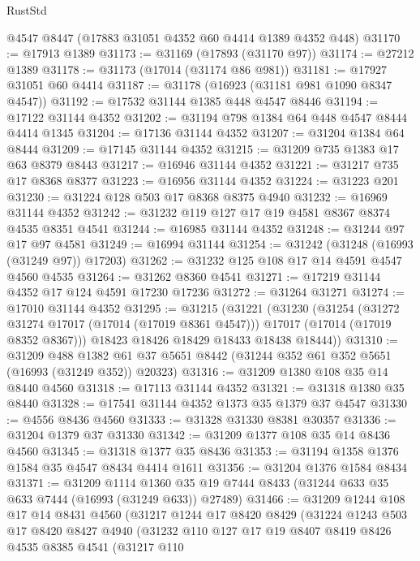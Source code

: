 \begin{lexlean}{RustStd}
\begin{coremodule}
{\begin{coremodule}
{{{{{{{{{{{{{{{{{{{{{{{{{{{{{{{{{{{{{{{{{{{{{{{{{{{{{{{    @4547
    @8447
    (@17883 @31051 @4352 @60 @4414 @1389 @4352 @448)
@31170 := @17913 @1389
@31173 := @31169 (@17893 (@31170 @97))
@31174 := @27212 @1389
@31178 := @31173 (@17014 (@31174 @86 @981))
@31181 := @17927 @31051 @60 @4414
@31187 := @31178 (@16923 (@31181 @981 @1090 @8347 @4547))
@31192 := @17532 @31144 @1385 @448 @4547 @8446
@31194 := @17122 @31144 @4352
@31202 := @31194 @798 @1384 @64 @448 @4547 @8444 @4414 @1345
@31204 := @17136 @31144 @4352
@31207 := @31204 @1384 @64 @8444
@31209 := @17145 @31144 @4352
@31215 := @31209 @735 @1383 @17 @63 @8379 @8443
@31217 := @16946 @31144 @4352
@31221 := @31217 @735 @17 @8368 @8377
@31223 := @16956 @31144 @4352
@31224 := @31223 @201
@31230 := @31224 @128 @503 @17 @8368 @8375 @4940
@31232 := @16969 @31144 @4352
@31242 := @31232 @119 @127 @17 @19 @4581 @8367 @8374 @4535 @8351 @4541
@31244 := @16985 @31144 @4352
@31248 := @31244 @97 @17 @97 @4581
@31249 := @16994 @31144
@31254 := @31242 (@31248 (@16993 (@31249 @97)) @17203)
@31262 := @31232 @125 @108 @17 @14 @4591 @4547 @4560 @4535
@31264 := @31262 @8360 @4541
@31271 := @17219 @31144 @4352 @17 @124 @4591 @17230 @17236
@31272 := @31264 @31271
@31274 := @17010 @31144 @4352
@31295 := @31215
    (@31221
      (@31230
        (@31254
          (@31272 @31274 @17017 (@17014 (@17019 @8361 @4547)))
          @17017
          (@17014 (@17019 @8352 @8367)))
        @18423
        @18426
        @18429
        @18433
        @18438
        @18444))
@31310 := @31209
    @488
    @1382
    @61
    @37
    @5651
    @8442
    (@31244 @352 @61 @352 @5651 (@16993 (@31249 @352)) @20323)
@31316 := @31209 @1380 @108 @35 @14 @8440 @4560
@31318 := @17113 @31144 @4352
@31321 := @31318 @1380 @35 @8440
@31328 := @17541 @31144 @4352 @1373 @35 @1379 @37 @4547
@31330 := @4556 @8436 @4560
@31333 := @31328 @31330 @8381 @30357
@31336 := @31204 @1379 @37 @31330
@31342 := @31209 @1377 @108 @35 @14 @8436 @4560
@31345 := @31318 @1377 @35 @8436
@31353 := @31194 @1358 @1376 @1584 @35 @4547 @8434 @4414 @1611
@31356 := @31204 @1376 @1584 @8434
@31371 := @31209
    @1114
    @1360
    @35
    @19
    @7444
    @8433
    (@31244 @633 @35 @633 @7444 (@16993 (@31249 @633)) @27489)
@31466 := @31209
    @1244
    @108
    @17
    @14
    @8431
    @4560
    (@31217
      @1244
      @17
      @8420
      @8429
      (@31224
        @1243
        @503
        @17
        @8420
        @8427
        @4940
        (@31232
          @110
          @127
          @17
          @19
          @8407
          @8419
          @8426
          @4535
          @8385
          @4541
          (@31217
            @110
}}}}}}}}}}}}}}}}}}}}}}}}}}}}}}}}}}}}}}}}}}}}}}}}}}}}}}}
\end{coremodule}}
\end{coremodule}
\end{lexlean}
